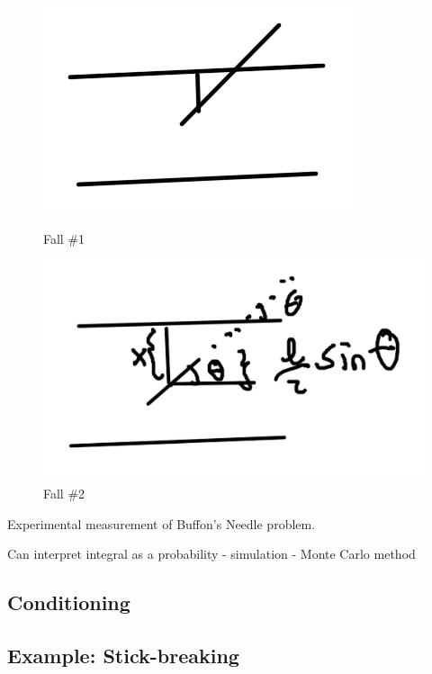 \begin{figure}[ht]
\centering
\begin{minipage}{.45\linewidth}
  \includegraphics[width=\linewidth]{images/L09/buffon1.jpeg}
  \caption{Fall \#1}
  \label{bufffon1}
\end{minipage}
\hspace{.05\linewidth}
\begin{minipage}{.45\linewidth}
  \includegraphics[width=\linewidth]{images/L09/buffon2.jpeg}
  \caption{Fall \#2}
  \label{bufffon2}
\end{minipage}
\end{figure}



Experimental measurement of Buffon's Needle problem.


Can interpret integral as a probability - simulation - Monte Carlo method

\subsection{Conditioning}


\subsection{Example: Stick-breaking}

